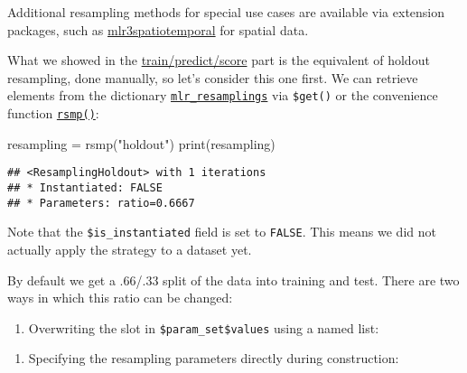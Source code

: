 \documentclass[
]{scrbook}
\newenvironment{Shaded}{\begin{snugshade}}{\end{snugshade}}
\newcommand{\AttributeTok}[1]{\textcolor[rgb]{0.77,0.63,0.00}{#1}}
\newcommand{\FloatTok}[1]{\textcolor[rgb]{0.00,0.00,0.81}{#1}}
\newcommand{\FunctionTok}[1]{\textcolor[rgb]{0.00,0.00,0.00}{#1}}
\newcommand{\NormalTok}[1]{#1}
\newcommand{\OtherTok}[1]{\textcolor[rgb]{0.56,0.35,0.01}{#1}}
\newcommand{\SpecialCharTok}[1]{\textcolor[rgb]{0.00,0.00,0.00}{#1}}
\newcommand{\StringTok}[1]{\textcolor[rgb]{0.31,0.60,0.02}{#1}}
\providecommand{\tightlist}{%
  \setlength{\itemsep}{0pt}\setlength{\parskip}{0pt}}
\renewenvironment{Shaded} {\begin{snugshade}\small} {\end{snugshade}}
\begin{document}
Additional resampling methods for special use cases are available via extension packages, such as \href{https://github.com/mlr-org/mlr3spatiotemporal}{mlr3spatiotemporal} for spatial data.

What we showed in the \protect\hyperlink{train-predict}{train/predict/score} part is the equivalent of holdout resampling, done manually, so let's consider this one first.
We can retrieve elements from the dictionary \href{https://mlr3.mlr-org.com/reference/mlr_resamplings.html}{\texttt{mlr\_resamplings}} via \texttt{\$get()} or the convenience function \href{https://mlr3.mlr-org.com/reference/mlr_sugar.html}{\texttt{rsmp()}}:

\begin{Shaded}
\begin{Highlighting}[]
\NormalTok{resampling }\OtherTok{=} \FunctionTok{rsmp}\NormalTok{(}\StringTok{"holdout"}\NormalTok{)}
\FunctionTok{print}\NormalTok{(resampling)}
\end{Highlighting}
\end{Shaded}

\begin{verbatim}
## <ResamplingHoldout> with 1 iterations
## * Instantiated: FALSE
## * Parameters: ratio=0.6667
\end{verbatim}

Note that the \texttt{\$is\_instantiated} field is set to \texttt{FALSE}.
This means we did not actually apply the strategy to a dataset yet.

By default we get a .66/.33 split of the data into training and test.
There are two ways in which this ratio can be changed:

\begin{enumerate}
\def\labelenumi{\arabic{enumi}.}
\tightlist
\item
  Overwriting the slot in \texttt{\$param\_set\$values} using a named list:
\end{enumerate}

\begin{Shaded}
\end{Shaded}

\begin{enumerate}
\def\labelenumi{\arabic{enumi}.}
\setcounter{enumi}{1}
\tightlist
\item
  Specifying the resampling parameters directly during construction:
\end{enumerate}
\end{document}
